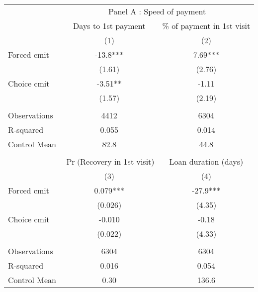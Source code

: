 \begin{tabular}{lcc}
\toprule
      & \multicolumn{2}{c}{Panel A  : Speed of payment} \\
\cmidrule{2-3}      & Days to 1st payment & \% of payment in 1st visit \\
\midrule
\midrule
      & (1)   & (2) \\
\midrule
\midrule
Forced cmit & -13.8*** & 7.69*** \\
      & (1.61) & (2.76) \\
Choice cmit & -3.51** & -1.11 \\
      & (1.57) & (2.19) \\
      &       &  \\
\midrule
Observations & 4412  & 6304 \\
R-squared & 0.055 & 0.014 \\
Control Mean & 82.8  & 44.8 \\
\midrule
\midrule
      &       &  \\
\midrule
      & $\Pr($Recovery in 1st visit) & \textcolor[rgb]{ .651,  .651,  .651}{Loan duration (days)} \\
\midrule
\midrule
      & (3)   & \textcolor[rgb]{ .651,  .651,  .651}{(4)} \\
\midrule
\midrule
Forced cmit & 0.079*** & \textcolor[rgb]{ .651,  .651,  .651}{-27.9***} \\
      & (0.026) & \textcolor[rgb]{ .651,  .651,  .651}{(4.35)} \\
Choice cmit & -0.010 & \textcolor[rgb]{ .651,  .651,  .651}{-0.18} \\
      & (0.022) & \textcolor[rgb]{ .651,  .651,  .651}{(4.33)} \\
      &       & \textcolor[rgb]{ .651,  .651,  .651}{} \\
\midrule
Observations & 6304  & \textcolor[rgb]{ .651,  .651,  .651}{6304} \\
R-squared & 0.016 & \textcolor[rgb]{ .651,  .651,  .651}{0.054} \\
Control Mean & 0.30  & \textcolor[rgb]{ .651,  .651,  .651}{136.6} \\
\bottomrule
\bottomrule
\end{tabular}%
